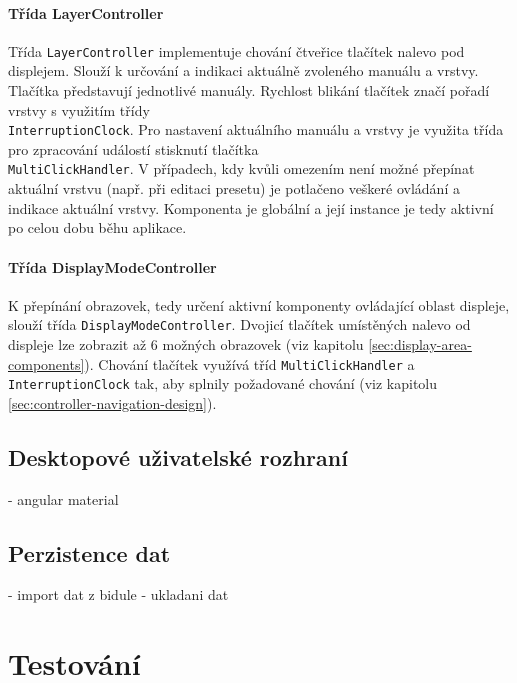 \documentclass[thesis=M,czech]{FITthesis}[2019/03/06]
\begin{document}
			\subsubsection{Třída LayerController}
				Třída \texttt{LayerController} implementuje chování čtveřice tlačítek nalevo pod displejem. Slouží k určování a indikaci aktuálně zvoleného manuálu a vrstvy.
				Tlačítka představují jednotlivé manuály. Rychlost blikání tlačítek značí pořadí vrstvy s využitím třídy \\\texttt{InterruptionClock}. Pro nastavení
				aktuálního manuálu a vrstvy je využita třída pro zpracování událostí stisknutí tlačítka \\\texttt{MultiClickHandler}.
				V případech, kdy kvůli omezením není možné přepínat aktuální vrstvu (např. při editaci presetu) je potlačeno veškeré ovládání a indikace aktuální vrstvy.
				Komponenta je globální a její instance je tedy aktivní po celou dobu běhu aplikace.
			
			\subsubsection{Třída DisplayModeController}
				K přepínání obrazovek, tedy určení aktivní komponenty ovládající oblast displeje, slouží třída \texttt{DisplayModeController}. Dvojicí tlačítek
				umístěných nalevo od displeje lze zobrazit až 6 možných obrazovek (viz kapitolu \ref{sec:display-area-components}). Chování tlačítek využívá
				tříd \texttt{MultiClickHandler} a \texttt{InterruptionClock} tak, aby splnily požadované chování (viz kapitolu \ref{sec:controller-navigation-design}).
	
	\section{Desktopové uživatelské rozhraní}
		- angular material
		
	\section{Perzistence dat}

		- import dat z bidule
		- ukladani dat


\chapter{Testování}

\begin{conclusion}
\end{conclusion}
\end{document}
